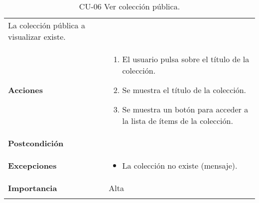 \begin{longtable}[]{@{}ll@{}}
\begin{minipage}[t]{0.69\columnwidth}
La colección pública a visualizar existe.\strut
\end{minipage}\tabularnewline
\begin{minipage}[t]{0.25\columnwidth}\raggedright
\textbf{Acciones}\strut
\end{minipage} & \begin{minipage}[t]{0.69\columnwidth}\raggedright
\begin{enumerate}
\def\labelenumi{\arabic{enumi}.}
\tightlist
\item
  El usuario pulsa sobre el título de la colección.
\item
  Se muestra el título de la colección.
\item
  Se muestra un botón para acceder a la lista de ítems de la colección.
\end{enumerate}\strut
\end{minipage}\tabularnewline
\begin{minipage}[t]{0.25\columnwidth}\raggedright
\textbf{Postcondición}\strut
\end{minipage} & \begin{minipage}[t]{0.69\columnwidth}\raggedright
\strut
\end{minipage}\tabularnewline
\begin{minipage}[t]{0.25\columnwidth}\raggedright
\textbf{Excepciones}\strut
\end{minipage} & \begin{minipage}[t]{0.69\columnwidth}\raggedright
\begin{itemize}
\tightlist
\item
  La colección no existe (mensaje).
\end{itemize}\strut
\end{minipage}\tabularnewline
\begin{minipage}[t]{0.25\columnwidth}\raggedright
\textbf{Importancia}\strut
\end{minipage} & \begin{minipage}[t]{0.69\columnwidth}\raggedright
Alta\strut
\end{minipage}\tabularnewline
\bottomrule
\caption{CU-06 Ver colección pública.}
\end{longtable}

